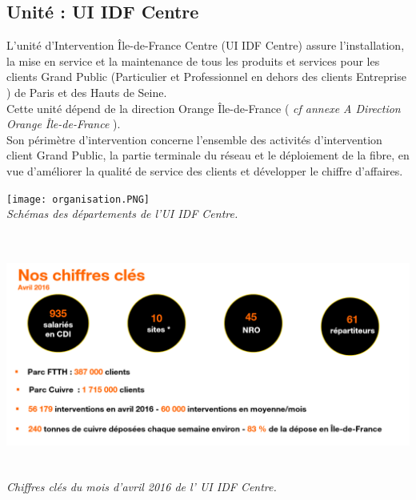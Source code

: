 \documentclass[a4paper,twoside,12pt]{report}
\begin{document}
\subsection{Unité : UI IDF Centre}
L'unité d'Intervention Île-de-France Centre (UI IDF Centre) assure l'installation, la mise en service et la maintenance de tous les produits et services pour les clients Grand Public (Particulier et Professionnel en dehors des clients Entreprise ) de Paris et des Hauts de Seine.\\
Cette unité dépend de la direction Orange Île-de-France (
\emph{cf annexe A Direction Orange Île-de-France}
).\\
Son périmètre d'intervention concerne l'ensemble des activités d'intervention client Grand Public, la partie terminale du réseau et le déploiement de la fibre, en vue d'améliorer la qualité de service des clients et développer le chiffre d'affaires.\\
\begin{center}
\texttt{[image: organisation.PNG]}\\
\itshape Schémas des départements de l'UI IDF Centre.
\end{center}
\begin{center}
\includegraphics[height=8cm]{chiffre.PNG}\\
\itshape Chiffres clés du mois d'avril 2016 de l' UI IDF Centre.
\end{center}
\newpage
\end{document}
